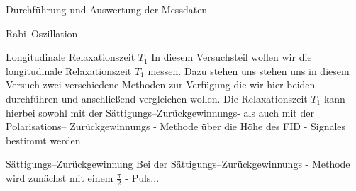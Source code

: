 \documentclass[pdftex, a4paper,11pt, twoside, ngerman]{report}
\begin{document}
\begin{chapter}{Durchführung und Auswertung der Messdaten}
\begin{section}{Rabi--Oszillation}
    \end{section}
    
    
    
    \begin{section}{
        Longitudinale Relaxationszeit $T_{1}$}
      \label{chpLongRelax}
      In diesem Versuchsteil wollen wir die longitudinale Relaxationszeit
      $T_{1}$ messen.
      Dazu stehen uns stehen uns in diesem Versuch zwei verschiedene Methoden
      zur Verfügung die wir hier beiden durchführen und anschließend
      vergleichen wollen.
      Die Relaxationszeit $T_{1}$ kann hierbei sowohl mit der
      Sättigungs--Zurückgewinnungs- als auch mit der Polarisations--
      Zurückgewinnungs - Methode über die Höhe des FID - Signales bestimmt
      werden.
      
      
      \begin{subsection}{Sättigungs--Zurückgewinnung}
        \label{chpLongRelaxSaettigung}
        Bei der Sättigungs--Zurückgewinnungs - Methode wird zunächst mit einem
        $\frac{\pi}{2}$ - Puls... 
        

\end{subsection}
\end{section}
\end{chapter}
\end{document}
